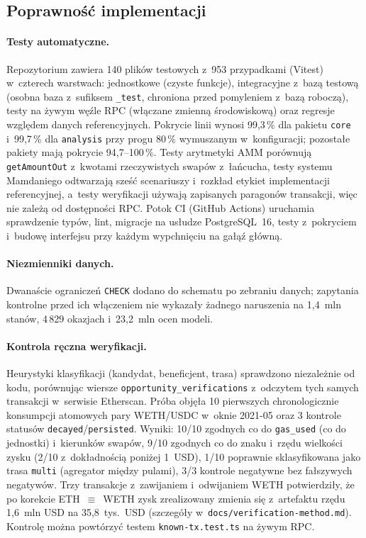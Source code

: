 \subsection{Poprawność implementacji}

\paragraph{Testy automatyczne.} Repozytorium zawiera 140 plików testowych z~953 przypadkami
(Vitest) w~czterech warstwach: jednostkowe (czyste funkcje), integracyjne z~bazą testową
(osobna baza z~sufiksem \texttt{\_test}, chroniona przed pomyleniem z~bazą roboczą), testy na
żywym węźle RPC (włączane zmienną środowiskową) oraz regresje względem danych referencyjnych.
Pokrycie linii wynosi 99,3\,\% dla pakietu \texttt{core} i~99,7\,\% dla \texttt{analysis} przy
progu 80\,\% wymuszanym w~konfiguracji; pozostałe pakiety mają pokrycie 94,7--100\,\%. Testy
arytmetyki AMM porównują \texttt{getAmountOut} z~kwotami rzeczywistych swapów z~łańcucha, testy
systemu Mamdaniego odtwarzają sześć scenariuszy i~rozkład etykiet implementacji referencyjnej,
a~testy
weryfikacji używają zapisanych paragonów transakcji, więc nie zależą od dostępności RPC. Potok
CI (GitHub Actions) uruchamia sprawdzenie typów, lint, migracje na usłudze PostgreSQL~16, testy
z~pokryciem i~budowę interfejsu przy każdym wypchnięciu na gałąź główną.

\paragraph{Niezmienniki danych.} Dwanaście ograniczeń \texttt{CHECK} dodano do schematu po
zebraniu danych; zapytania kontrolne przed ich włączeniem nie wykazały żadnego naruszenia na
1,4~mln stanów, 4\,829 okazjach i~23,2~mln ocen modeli.

\paragraph{Kontrola ręczna weryfikacji.} Heurystyki klasyfikacji (kandydat, beneficjent,
trasa) sprawdzono niezależnie od kodu, porównując wiersze
\texttt{opportunity\_verifications} z~odczytem tych samych transakcji w~serwisie Etherscan.
Próba objęła 10 pierwszych chronologicznie konsumpcji atomowych pary WETH/USDC w~oknie 2021-05
oraz 3 kontrole statusów \texttt{decayed}/\texttt{persisted}. Wyniki: 10/10 zgodnych co do
\texttt{gas\_used} (co do jednostki) i~kierunków swapów, 9/10 zgodnych co do znaku i~rzędu
wielkości zysku (2/10 z~dokładnością poniżej 1~USD), 1/10 poprawnie sklasyfikowana jako trasa
\texttt{multi} (agregator między pulami), 3/3 kontrole negatywne bez fałszywych negatywów.
Trzy transakcje z~zawijaniem i~odwijaniem WETH potwierdziły, że po korekcie ETH~$\equiv$~WETH
zysk zrealizowany zmienia się z~artefaktu rzędu 1,6~mln USD na 35,8~tys.~USD (szczegóły
w~\texttt{docs/verification-method.md}). Kontrolę można powtórzyć testem
\texttt{known-tx.test.ts} na żywym RPC.

